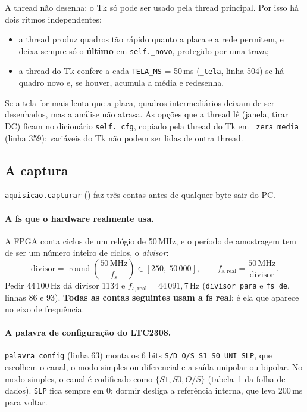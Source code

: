\documentclass[11pt,a4paper,oneside]{article}
\newcommand{\arq}[1]{{\upshape\ttfamily\detokenize{#1}}}
\begin{document}
A thread não desenha: o Tk só pode ser usado pela thread principal. Por isso
há dois ritmos independentes:

\begin{itemize}
\item a thread produz quadros tão rápido quanto a placa e a rede permitem, e
  deixa sempre só o \textbf{último} em \texttt{self.\_novo}, protegido por uma
  trava;
\item a thread do Tk confere a cada \texttt{TELA\_MS} = 50\,ms
  (\texttt{\_tela}, linha 504) se há quadro novo e, se houver, acumula a média
  e redesenha.
\end{itemize}

Se a tela for mais lenta que a placa, quadros intermediários deixam de ser
desenhados, mas a análise não atrasa. As opções que a thread lê (janela, tirar
DC) ficam no dicionário \texttt{self.\_cfg}, copiado pela thread do Tk em
\texttt{\_zera\_media} (linha 359): variáveis do Tk não podem ser lidas de
outra thread.

\subsection{A captura}
\label{sec:captura-py}

\texttt{aquisicao.capturar} (\arq{aquisicao.py:139}) faz três contas antes de
qualquer byte sair do PC.

\paragraph{A fs que o hardware realmente usa.} A FPGA conta ciclos de um
relógio de 50\,MHz, e o período de amostragem tem de ser um número inteiro de
ciclos, o \emph{divisor}:
\[
  \text{divisor} = \operatorname{round}\!\left(\frac{50\,\text{MHz}}{f_s}\right)
  \in [250,\ 50\,000],
  \qquad
  f_{s,\text{real}} = \frac{50\,\text{MHz}}{\text{divisor}} .
\]
Pedir 44\,100\,Hz dá divisor 1134 e $f_{s,\text{real}} = 44\,091{,}7$\,Hz
(\texttt{divisor\_para} e \texttt{fs\_de}, linhas 86 e 93). \textbf{Todas as
contas seguintes usam a fs real}; é ela que aparece no eixo de frequência.

\paragraph{A palavra de configuração do LTC2308.} \texttt{palavra\_config}
(linha 63) monta os 6 bits \texttt{S/D O/S S1 S0 UNI SLP}, que escolhem o canal,
o modo simples ou diferencial e a saída unipolar ou bipolar. No modo simples, o
canal é codificado como $\{S1, S0, O/S\}$ (tabela~1 da folha de dados).
\texttt{SLP} fica sempre em 0: dormir desliga a referência interna, que leva
200\,ms para voltar.
\end{document}
